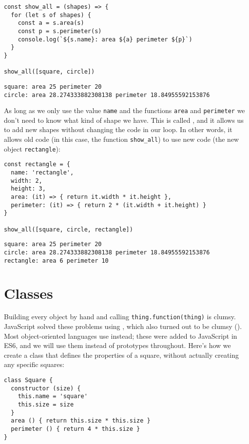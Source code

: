 \begin{verbatim}
const show_all = (shapes) => {
  for (let s of shapes) {
    const a = s.area(s)
    const p = s.perimeter(s)
    console.log(`${s.name}: area ${a} perimeter ${p}`)
  }
}

show_all([square, circle])
\end{verbatim}

\begin{verbatim}
square: area 25 perimeter 20
circle: area 28.274333882308138 perimeter 18.84955592153876
\end{verbatim}

As long as we only use the value \texttt{name} and the functions \texttt{area} and \texttt{perimeter}
we don't need to know what kind of shape we have.
This is called ,
and it allows us to add new shapes without changing the code in our loop.
In other words,
it allows old code (in this case, the function \texttt{show\_all})
to use new code (the new object \texttt{rectangle}):

\begin{verbatim}
const rectangle = {
  name: 'rectangle',
  width: 2,
  height: 3,
  area: (it) => { return it.width * it.height },
  perimeter: (it) => { return 2 * (it.width + it.height) }
}

show_all([square, circle, rectangle])
\end{verbatim}

\begin{verbatim}
square: area 25 perimeter 20
circle: area 28.274333882308138 perimeter 18.84955592153876
rectangle: area 6 perimeter 10
\end{verbatim}

\section{Classes}\label{s:oop-classes}

Building every object by hand and calling \texttt{thing.function(thing)} is clumsy.
JavaScript solved these problems using ,
which also turned out to be clumsy ().
Most object-oriented languages use  instead;
these were added to JavaScript in ES6,
and we will use them instead of prototypes throughout.
Here's how we create a class that defines the properties of a square,
without actually creating any specific squares:

\begin{verbatim}
class Square {
  constructor (size) {
    this.name = 'square'
    this.size = size
  }
  area () { return this.size * this.size }
  perimeter () { return 4 * this.size }
}
\end{verbatim}

